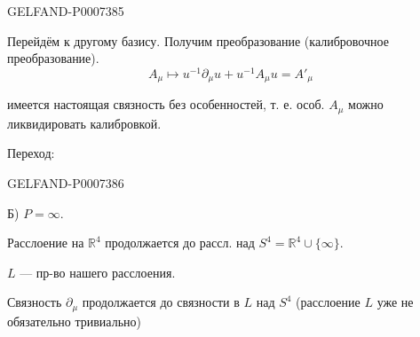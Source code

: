 \begin{GelfandAdjacentEvidence}{GELFAND-P000738}{5}


Перейдём к другому базису. Получим преобразование (калибровочное преобразование).
\begin{equation*}
\tag*{(4)\hfill}
A_\mu\mapsto u^{-1}\partial_\mu u+u^{-1}A_\mu u=A'_\mu
\end{equation*}

 имеется настоящая связность без особенностей, т. е. особ. \(A_\mu\) можно ликвидировать калибровкой.

Переход:
\end{GelfandAdjacentEvidence}
\begin{GelfandAdjacentEvidence}{GELFAND-P000738}{6}


Б)  \(P=\infty\).

Расслоение на
\(\mathbb R^4\) продолжается до рассл. над \(S^4=\mathbb R^4\cup\{\infty\}\).
\end{GelfandAdjacentEvidence}

\(L\) --- пр-во нашего расслоения.

 Связность \(\partial_\mu\) продолжается до связности в \(L\) над \(S^4\)
(расслоение \(L\) уже не обязательно тривиально)


